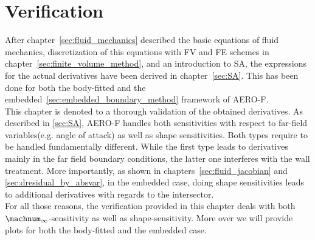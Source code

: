 \documentclass[../main.tex]{subfiles}
\begin{document}
\setlength{\delimitershortfall}{0pt}

\chapter{Verification}\label{sec:verification}
\minitoc

After chapter~\ref{sec:fluid_mechanics} described the basic equations of fluid mechanics, discretization of this equations with \ac{FV} and \ac{FE} schemes in chapter~\ref{sec:finite_volume_method}, and an introduction to \ac{SA}, the expressions for the actual derivatives have been derived in chapter~\ref{sec:SA}. This has been done for both the body-fitted and the embedded~\ref{sec:embedded_boundary_method} framework of AERO-F.\\
This chapter is denoted to a thorough validation of the obtained derivatives. As described in \ref{sec:SA}, AERO-F handles both sensitivities with respect to far-field variables(e.g. angle of attack) as well as shape sensitivities. Both types require to be handled fundamentally different. While the first type leads to derivatives mainly in the far field boundary conditions, the latter one interferes with the wall treatment. More importantly, as shown in chapters~\ref{sec:fluid_jacobian} and \ref{sec:dresidual_by_absvar}, in the embedded case, doing shape sensitivities leads to additional derivatives with regards to the intersector.\\
For all those reasons, the verification provided in this chapter deals with both $\machnum_{\infty}$-sensitivity as well as shape-sensitivity. More over we will provide plots for both the body-fitted and the embedded case.
\end{document}
